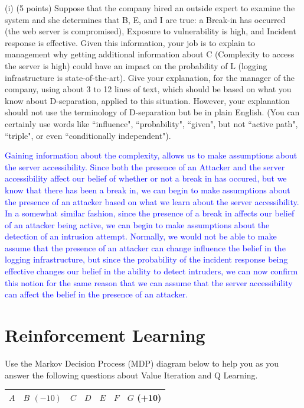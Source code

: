 \documentclass[12pt]{article}
\begin{document}
(i) (5 points) Suppose that the company hired an outside expert to
examine the system and she determines that B,
E, and I are true: a Break-in has occurred (the web server is compromised), Exposure to vulnerability is high, and Incident
response is effective.  Given this
information, your job is to explain to management why getting additional
information about C (Complexity to access the server is high) could have an impact on
the probability of L (logging infrastructure
is state-of-the-art).  Give your explanation, for the manager of the company,
using about 3 to 12 lines of text, which should be based on
what you know about D-separation, applied to this situation.  However,
your explanation should not use the terminology of D-separation but be in plain English.
(You can certainly use words like ``influence", ``probability", ``given",
but not ``active path", ``triple", or even ``conditionally independent").

\textcolor{blue}{Gaining information about the complexity, allows us to make assumptions about the server accessibility. Since both the presence of an Attacker
  and the server accessibility affect our belief of whether or not a break in has occured, but we know that there has been a break in, we can begin to make assumptions about the presence of an attacker based on what we learn about the server accessibility.
  In a somewhat similar fashion, since the presence of a break in affects our belief of an attacker being active, we can begin to make assumptions about the detection of an intrusion attempt.
  Normally, we would not be able to make assume that the presence of an attacker can change influence the belief in the logging infrastructure, but since the probability of the incident response being effective changes our belief in the ability to detect intruders,
  we can now confirm this notion for the same reason that we can assume that the server accessibility can affect the belief in the presence of an attacker.}


\newpage
\section{Reinforcement Learning}
Use the Markov Decision Process (MDP) diagram below to help you as you answer the following questions about Value Iteration and Q Learning.

\bgroup
\def\arraystretch{3}

\begin{table}[!h]
  \centering
  \begin{tabular}{|P{1.5cm}|P{1.65cm}|P{1.5cm}|P{1.5cm}|P{1.5cm}|P{1.5cm}|P{1.65cm}|}
    \hline
    $A$ & $B$ $(-10)$ & $C$ & $D$ & $E$ & $F$ & $G$ (+10) \\ \hline
  \end{tabular}
\end{table}
\egroup
\end{document}

